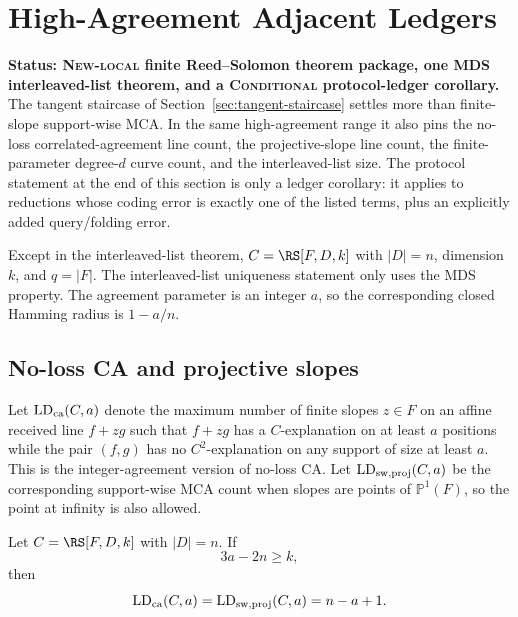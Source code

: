 \section{High-Agreement Adjacent Ledgers}
\label{sec:high-agreement-adjacent-ledgers}

\textbf{Status: \textsc{New-local} finite Reed--Solomon theorem package,
one MDS interleaved-list theorem, and a \textsc{Conditional} protocol-ledger
corollary.}
The tangent staircase of Section~\ref{sec:tangent-staircase} settles more than
finite-slope support-wise MCA.  In the same high-agreement range it also pins
the no-loss correlated-agreement line count, the projective-slope line count,
the finite-parameter degree-\(d\) curve count, and the interleaved-list size.
The protocol statement at the end of this section is only a ledger corollary:
it applies to reductions whose coding error is exactly one of the listed
terms, plus an explicitly added query/folding error.

Except in the interleaved-list theorem, \(C=\RS[F,D,k]\) with
\(|D|=n\), dimension \(k\), and \(q=|F|\).  The interleaved-list uniqueness
statement only uses the MDS property.  The agreement parameter is an integer
\(a\), so the corresponding closed Hamming radius is \(1-a/n\).

\subsection{No-loss CA and projective slopes}

Let \(\operatorname{LD}_{\rm ca}(C,a)\) denote the maximum number of finite
slopes \(z\in F\) on an affine received line \(f+zg\) such that \(f+zg\) has a
\(C\)-explanation on at least \(a\) positions while the pair \((f,g)\) has no
\(C^2\)-explanation on any support of size at least \(a\).  This is the
integer-agreement version of no-loss CA.  Let
\(\operatorname{LD}_{\rm sw,proj}(C,a)\) be the corresponding support-wise MCA
count when slopes are points of \(\mathbb P^1(F)\), so the point at infinity is
also allowed.

\begin{theorem}
\label{thm:ca-projective-tangent-staircase}
Let \(C=\RS[F,D,k]\) with \(|D|=n\).  If
\[
  3a-2n\ge k,
\]
then
\[
  \operatorname{LD}_{\rm ca}(C,a)
  =
  \operatorname{LD}_{\rm sw,proj}(C,a)
  =
  n-a+1 .
\]
\end{theorem}

